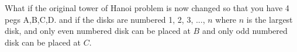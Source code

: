 What if the original tower of Hanoi problem is now changed so
that you have 4 pegs A,B,C,D.
and if the disks are numbered 1, 2, 3, ..., $n$ where $n$ is the largest disk,
and only even numbered disk can be placed at $B$ and only odd numbered disk can
be placed at $C$.

